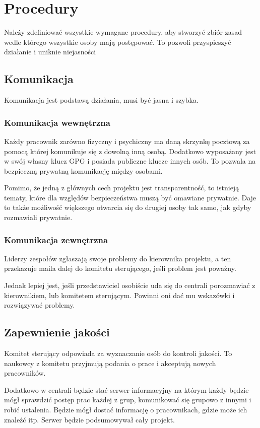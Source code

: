 \section{Procedury}
Należy zdefiniować wszystkie wymagane procedury, aby stworzyć zbiór zasad wedle którego wszystkie osoby mają postępować.
To pozwoli przyspieszyć działanie i uniknie niejasności
\subsection{Komunikacja}
Komunikacja jest podstawą działania, musi być jasna i szybka.
\subsubsection{Komunikacja wewnętrzna}
Każdy pracownik zarówno fizyczny i psychiczny ma daną skrzynkę pocztową za pomocą której komunikuje się z dowolną inną osobą.
Dodatkowo wyposażany jest w swój własny klucz GPG i posiada publiczne klucze innych osób.
To pozwala na bezpieczną prywatną komunikację między osobami.

Pomimo, że jedną z głównych cech projektu jest transparentność, to istnieją tematy, które dla względów bezpieczeństwa muszą być omawiane prywatnie.
Daje to także możliwość większego otwarcia się do drugiej osoby tak samo, jak gdyby rozmawiali prywatnie.

\subsubsection{Komunikacja zewnętrzna}
Liderzy zespołów zgłaszają swoje problemy do kierownika projektu, a ten przekazuje maila dalej do komitetu sterującego, jeśli problem jest poważny.

Jednak lepiej jest, jeśli przedstawiciel osobiście uda się do centrali porozmawiać z kierownikiem, lub komitetem sterującym.
Powinni oni dać mu wskazówki i rozwiązywać problemy.

\subsection{Zapewnienie jakości}
Komitet sterujący odpowiada za wyznaczanie osób do kontroli jakości.
To naukowcy z komitetu przyjmują podania o prace i akceptują nowych pracowników.

Dodatkowo w centrali będzie stać serwer informacyjny na którym każdy będzie mógł sprawdzić postęp prac każdej z grup, komunikować się grupowo z innymi i robić ustalenia.
Będzie mógł dostać informację o pracownikach, gdzie może ich znaleźć itp.
Serwer będzie podsumowywał cały projekt.

